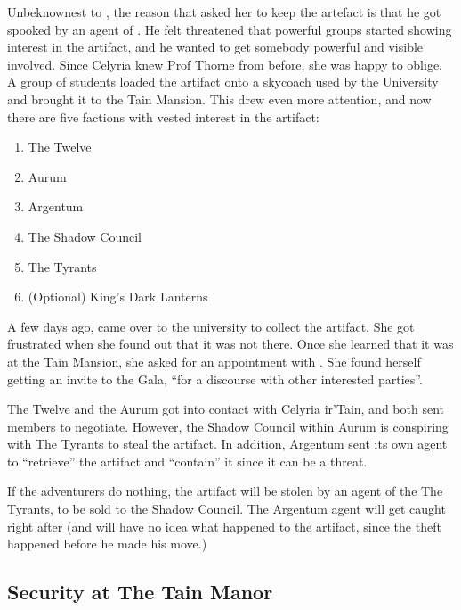 \documentclass[twocolumn]{dndbook}
\begin{document}
Unbeknownest to , the reason that
 asked her to keep the artefact is
that he got spooked
by an agent of . He felt threatened that
powerful groups started showing interest in the artifact, and he wanted
to get somebody powerful and visible involved. Since Celyria knew Prof Thorne
from before, she was happy to oblige. A group of students loaded the artifact
onto a skycoach used by the University and brought it to the Tain Mansion.
This drew even more attention, and now there are five factions with vested interest
in the artifact:

\begin{enumerate}
    \item The Twelve
    \item Aurum
    \item Argentum
    \item The Shadow Council
    \item The Tyrants
    \item (Optional) King's Dark Lanterns
\end{enumerate}

A few days ago,  came over to the university to collect the artifact.
She got frustrated when she found out that it was not there.
Once she learned that it was at the Tain Mansion, she asked for an appointment with .
She found herself getting an invite to the Gala, ``for a discourse with other interested parties''.\par

The Twelve and the Aurum got into contact with Celyria ir'Tain, and both sent members to negotiate.
However, the Shadow Council within Aurum is conspiring with The Tyrants to steal the artifact.
In addition, Argentum sent its own agent to ``retrieve'' the artifact and ``contain'' it since it can be a threat.\par

If the adventurers do nothing, the artifact will be stolen by an agent of the The Tyrants, to be sold to the Shadow Council.
The Argentum agent will get caught right after (and will have no idea what happened to the artifact, since the theft happened before he made his move.)



\subsection{Security at The Tain Manor}
\end{document}
